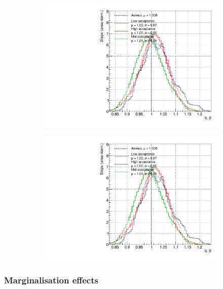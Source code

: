 \begin{figure}[h]
\begin{subfigure}[t]{0.49\textwidth}
	\includegraphics[width=\textwidth, trim={0mm 0mm 0mm 0mm}, clip,page=135]{figures/mach3/Asimov/2017_NewDet_Asimov_actually_0_2017b_NewDet_3Xsec_4Det_5Flux_NewXSecTune_Asimov_0_2017b_NewDet_NewData_Asimov_Long_0}
\end{subfigure}
\begin{subfigure}[t]{0.49\textwidth}
	\includegraphics[width=\textwidth, trim={0mm 0mm 0mm 0mm}, clip,page=136]{figures/mach3/Asimov/2017_NewDet_Asimov_actually_0_2017b_NewDet_3Xsec_4Det_5Flux_NewXSecTune_Asimov_0_2017b_NewDet_NewData_Asimov_Long_0}
\end{subfigure}
\end{figure}

\subsubsection{Marginalisation effects}

